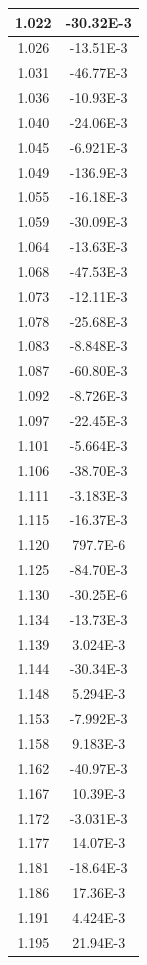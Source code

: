\documentclass[english, 12pt, a4paper]{ifimaster}
\begin{document}
\begin{appendices}
\begin{center}
\begin{longtable}[htbp]{|c|c|}
\hline
  1.022 & -30.32E-3 \\
\hline
  1.026 & -13.51E-3 \\
\hline
  1.031 & -46.77E-3 \\
\hline
  1.036 & -10.93E-3 \\
\hline
  1.040 & -24.06E-3 \\
\hline
  1.045 & -6.921E-3 \\
\hline
  1.049 & -136.9E-3 \\
\hline
  1.055 & -16.18E-3 \\
\hline
  1.059 & -30.09E-3 \\
\hline
  1.064 & -13.63E-3 \\
\hline
  1.068 & -47.53E-3 \\
\hline
  1.073 & -12.11E-3 \\
\hline
  1.078 & -25.68E-3 \\
\hline
  1.083 & -8.848E-3 \\
\hline
  1.087 & -60.80E-3 \\
\hline
  1.092 & -8.726E-3 \\
\hline
  1.097 & -22.45E-3 \\
\hline
  1.101 & -5.664E-3 \\
\hline
  1.106 & -38.70E-3 \\
\hline
  1.111 & -3.183E-3 \\
\hline
  1.115 & -16.37E-3 \\
\hline
  1.120 & 797.7E-6 \\
\hline
  1.125 & -84.70E-3 \\
\hline
  1.130 & -30.25E-6 \\
\hline
  1.134 & -13.73E-3 \\
\hline
  1.139 & 3.024E-3 \\
\hline
  1.144 & -30.34E-3 \\
\hline
  1.148 & 5.294E-3 \\
\hline
  1.153 & -7.992E-3 \\
\hline
  1.158 & 9.183E-3 \\
\hline
  1.162 & -40.97E-3 \\
\hline
  1.167 & 10.39E-3 \\
\hline
  1.172 & -3.031E-3 \\
\hline
  1.177 & 14.07E-3 \\
\hline
  1.181 & -18.64E-3 \\
\hline
  1.186 & 17.36E-3 \\
\hline
  1.191 & 4.424E-3 \\
\hline
  1.195 & 21.94E-3 \\
\hline
\end{longtable}
\end{center}


\end{appendices}
\end{document}
